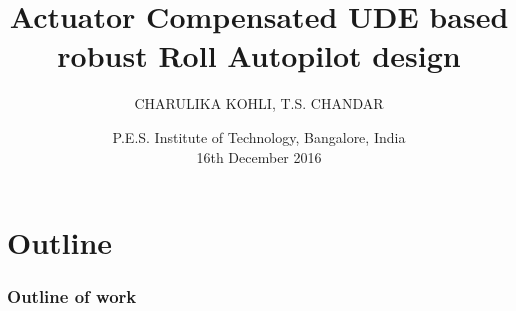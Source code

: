 \documentclass[table,10pt,red]{beamer}	%
\title
[
Actuator Compensated UDE based robust Roll Autopilot design	%
	\hspace{0.5cm}
	\insertframenumber/\inserttotalframenumber
]
{
	Actuator Compensated UDE based robust Roll Autopilot design
}
\author
[
CHARULIKA KOHLI, T.S. CHANDAR	%
]
{
	CHARULIKA KOHLI, T.S. CHANDAR \\
}
\date
{
P.E.S. Institute of Technology, Bangalore, India \\ 16th December 2016	%
}
\begin{document}

\begin{frame}	%
	\titlepage %
\end{frame}
\section*{Outline}
\begin{frame}
	\frametitle{Outline of work} %
	\tableofcontents %
\end{frame}
\end{document}
